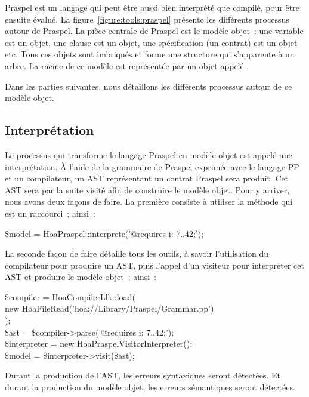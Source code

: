 Praspel est un langage qui peut être aussi bien interprété que compilé, pour
être ensuite évalué. La figure~\ref{figure:tools:praspel} présente les
différents processus autour de Praspel. La pièce centrale de Praspel est le
modèle objet~: une variable est un objet, une clause est un objet, une
spécification (un contrat) est un objet etc. Tous ces objets sont imbriqués et
forme une structure qui s'apparente à un arbre. La racine de ce modèle est
représentée par un objet appelé
.

Dans les parties suivantes, nous détaillons les différents processus autour de
ce modèle objet.

\subsection{Interprétation}
\label{subsection:tools:interpretation}

Le processus qui transforme le langage Praspel en modèle objet est appelé une
interprétation. À l'aide de la grammaire de Praspel exprimée avec le langage PP
et un compilateur, un AST représentant un contrat Praspel sera produit. Cet AST
sera par la suite visité afin de construire le modèle objet. Pour y arriver,
nous avons deux façons de faire. La première consiste à utiliser la méthode
 qui est un raccourci~; ainsi~:
%
\begin{pre}
\$model = Hoa\bslash{}Praspel::interprete('@requires i: 7..42;');
\end{pre}
%
La seconde façon de faire détaille tous les outils, à savoir l'utilisation du
compilateur pour produire un AST, puis l'appel d'un visiteur pour interpréter
cet AST et produire le modèle objet~; ainsi~:
%
\begin{pre}
\$compiler    = Hoa\bslash{}Compiler\bslash{}Llk::load( \\
    new Hoa\bslash{}File\bslash{}Read('hoa://Library/Praspel/Grammar.pp') \\
); \\
\$ast         = \$compiler->parse('@requires i: 7..42;'); \\
\$interpreter = new Hoa\bslash{}Praspel\bslash{}Visitor\bslash{}Interpreter(); \\
\$model       = \$interpreter->visit(\$ast);
\end{pre}
%
Durant la production de l'AST, les erreurs syntaxiques seront détectées. Et
durant la production du modèle objet, les erreurs sémantiques seront détectées.

